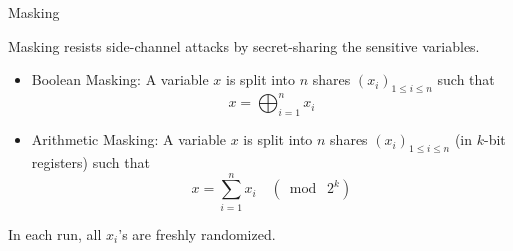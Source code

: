 %
%
%
\iffalse
\begin{frame}{Power and Electromagnetic Analysis Attacks}

\begin{itemize}
\item Power consumption and electromagnetic radiation during the execution of programs depend on intermediate values.
\pause
\item Side-channel attacks on the pre-image vector computation \cite{KA21, TCHES:GMRR22}, leverage this fact to find the secret key.
\end{itemize}

\end{frame}

%
%
%
\fi


\begin{frame}{Masking}

Masking resists side-channel attacks by secret-sharing the sensitive variables.
\pause
\begin{itemize}
	\item Boolean Masking: A variable $x$ is split into $n$ shares $(x_i)_{1\leq i \leq n}$ such that
	\[
	x = \bigoplus_{i=1}^n x_i
	\]
	\pause
	\item Arithmetic Masking: A variable $x$ is split into $n$ shares $(x_i)_{1\leq i \leq n}$ (in $k$-bit registers) such that
	\[
	x = \sum_{i=1}^n x_i \quad (\bmod\; 2^k)
	\]
\end{itemize}
\medskip
\pause

In each run, all $x_i$'s are freshly randomized.

\end{frame}

